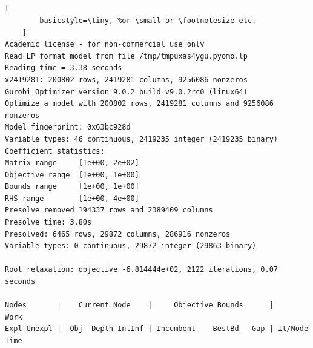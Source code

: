 \documentclass{article}
\begin{document}
    \subsection{}
    \begin{lstlisting}[
        basicstyle=\tiny, %or \small or \footnotesize etc.
    ]
Academic license - for non-commercial use only
Read LP format model from file /tmp/tmpuxas4ygu.pyomo.lp
Reading time = 3.38 seconds
x2419281: 200802 rows, 2419281 columns, 9256086 nonzeros
Gurobi Optimizer version 9.0.2 build v9.0.2rc0 (linux64)
Optimize a model with 200802 rows, 2419281 columns and 9256086 nonzeros
Model fingerprint: 0x63bc928d
Variable types: 46 continuous, 2419235 integer (2419235 binary)
Coefficient statistics:
Matrix range     [1e+00, 2e+02]
Objective range  [1e+00, 1e+00]
Bounds range     [1e+00, 1e+00]
RHS range        [1e+00, 4e+00]
Presolve removed 194337 rows and 2389409 columns
Presolve time: 3.80s
Presolved: 6465 rows, 29872 columns, 286916 nonzeros
Variable types: 0 continuous, 29872 integer (29863 binary)

Root relaxation: objective -6.814444e+02, 2122 iterations, 0.07 seconds

Nodes       |    Current Node    |     Objective Bounds      |     Work
Expl Unexpl |  Obj  Depth IntInf | Incumbent    BestBd   Gap | It/Node Time


\end{lstlisting}
\end{document}
